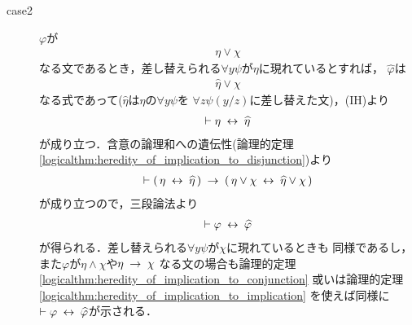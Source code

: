 \begin{sketch}
\begin{description}
\begin{description}
				\item[case2] 
					$\varphi$が
					\begin{align}
						\eta \vee \chi
					\end{align}
					なる文であるとき，差し替えられる$\forall y \psi$が$\eta$に現れているとすれば，
					$\widehat{\varphi}$は
					\begin{align}
						\widehat{\eta} \vee \chi
					\end{align}
					なる式であって($\widehat{\eta}$は$\eta$の$\forall y \psi$を
					$\forall z \psi(y/z)$に差し替えた文)，(IH)より
					\begin{align}
						\vdash \eta \hspace{0.25em}\leftrightarrow\hspace{0.25em} \widehat{\eta}
					\end{align}
					が成り立つ．含意の論理和への遺伝性(論理的定理
					\ref{logicalthm:heredity_of_implication_to_disjunction})より
					\begin{align}
						\vdash (\, \eta \hspace{0.25em}\leftrightarrow\hspace{0.25em} \widehat{\eta}\, ) 
						\hspace{0.25em}\rightarrow\hspace{0.25em} (\, \eta \vee \chi \hspace{0.25em}\leftrightarrow\hspace{0.25em} 
						\widehat{\eta} \vee \chi\, )
					\end{align}
					が成り立つので，三段論法より
					\begin{align}
						\vdash \varphi \hspace{0.25em}\leftrightarrow\hspace{0.25em} \widehat{\varphi}
					\end{align}
					が得られる．差し替えられる$\forall y \psi$が$\chi$に現れているときも
					同様であるし，また$\varphi$が$\eta \wedge \chi$や$\eta \hspace{0.25em}\rightarrow\hspace{0.25em} \chi$
					なる文の場合も論理的定理
					\ref{logicalthm:heredity_of_implication_to_conjunction}
					或いは論理的定理
					\ref{logicalthm:heredity_of_implication_to_implication}
					を使えば同様に$\vdash \varphi \hspace{0.25em}\leftrightarrow\hspace{0.25em} \widehat{\varphi}$が示される．
					
					

\end{description}
\end{description}
\end{sketch}

